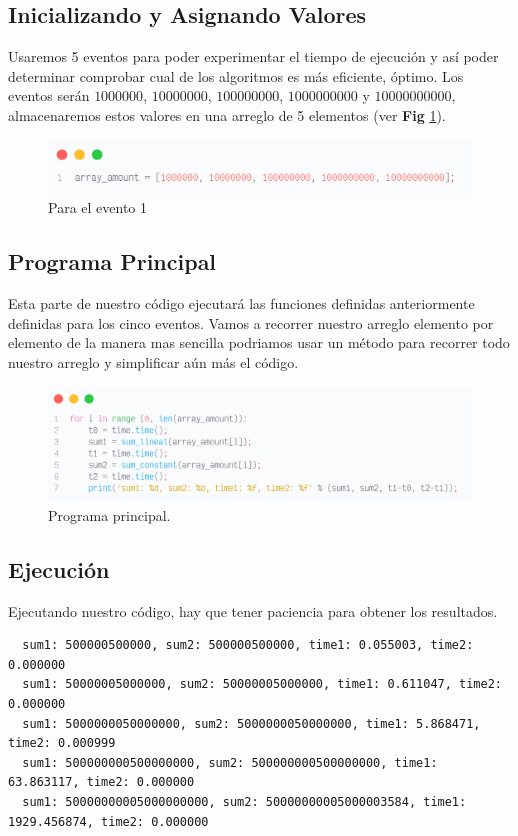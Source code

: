 \subsection{Inicializando y Asignando Valores}
Usaremos 5 eventos para poder experimentar el tiempo de ejecución y así poder
determinar comprobar cual de los algoritmos es más eficiente, óptimo. Los
eventos serán $1000000$, $10000000$, $100000000$, $1000000000$ y $10000000000$,
almacenaremos estos valores en una arreglo de 5 elementos (ver \textbf{Fig
}\ref{fig:fg4}).
\begin{figure}[H]
	\centering
	\includegraphics[width=1\textwidth]{Images/code4.png}
	\caption{Para el evento 1}\label{fig:fg4}
\end{figure}
\subsection{Programa Principal}
Esta parte de nuestro código ejecutará las funciones definidas anteriormente
definidas para los cinco eventos. Vamos a recorrer nuestro arreglo elemento por
elemento de la manera mas sencilla podriamos usar un método para recorrer todo
nuestro arreglo y simplificar aún más el código.
\begin{figure}[H]
	\centering
	\includegraphics[width=1\textwidth]{Images/code9.png}
	\caption{Programa principal.}\label{fig:fg9}
\end{figure}
\subsection{Ejecución}
Ejecutando nuestro código, hay que tener paciencia para obtener los resultados.

\begin{minipage}{16.2cm}
	\begin{verbatim}
  sum1: 500000500000, sum2: 500000500000, time1: 0.055003, time2: 0.000000
  sum1: 50000005000000, sum2: 50000005000000, time1: 0.611047, time2: 0.000000
  sum1: 5000000050000000, sum2: 5000000050000000, time1: 5.868471, time2: 0.000999
  sum1: 500000000500000000, sum2: 500000000500000000, time1: 63.863117, time2: 0.000000
  sum1: 50000000005000000000, sum2: 50000000005000003584, time1: 1929.456874, time2: 0.000000
	\end{verbatim}
\end{minipage}

